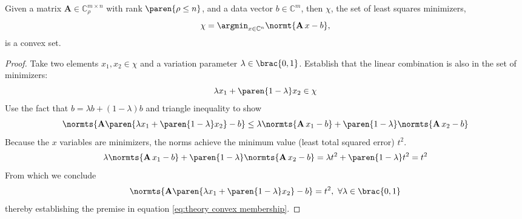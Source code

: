 % 

\begin{thm}

Given a matrix $\mathbf{A}\in\mathbb{C}^{m\times n}_{\rho}$ with rank $\paren{\rho\le n}$, and a data vector $b\in\mathbb{C}^{m}$, then $\chi$, the set of least squares minimizers,
%
\begin{equation*}
	\chi = \argmin_{x\in\mathbb{C}^{n}} \normt{\mathbf{A}\,x-b},
\end{equation*}
%
is a convex set.

\label{thm:theory convex set}
\end{thm}

\begin{proof}

%
Take two elements $x_{1}, x_{2} \in \chi$ and a variation parameter $\lambda\in\brac{0,1}$. Establish that the linear combination is also in the set of minimizers:
%
\begin{equation}
	\lambda x_{1} + \paren{1-\lambda} x_{2}\in\chi
\label{eq:convexity premise}
\end{equation}
%
Use the fact that $b= \lambda b + (1-\lambda) b$ and triangle inequality to show
\begin{equation}
	\begin{split}
		\normts{\mathbf{A}\paren{\lambda x_{1} + \paren{1-\lambda} x_{2}} - b} \le
		\lambda \normts{\mathbf{A}\,x_{1} - b} + \paren{1-\lambda}\normts{\mathbf{A}\,x_{2} - b}
	\end{split}
\label{eq:theory convex membership}
\end{equation}
%
Because the $x$ variables are minimizers, the norms achieve the minimum value (least total squared error) $t^{2}$.
%
\begin{equation}
	\lambda \normts{\mathbf{A}\,x_{1} - b} + \paren{1-\lambda}\normts{\mathbf{A}\,x_{2} - b} =
	\lambda t^{2} + \paren{1-\lambda}t^{2} = t^{2}
\end{equation}
%
From which we conclude
%
\begin{equation}
	\normts{\mathbf{A}\paren{\lambda x_{1} + \paren{1-\lambda} x_{2}} - b} = t^{2}, \ \forall \lambda \in \brac{0,1}
\end{equation}
%
thereby establishing the premise in equation \eqref{eq:theory convex membership}.
%
\end{proof}


\endinput %